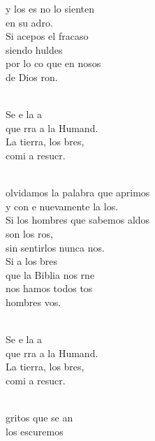 \documentclass[12pt]{article}
\begin{document}
\begin{multicols*}{2}
\begin{cancion}
	y los es no lo sienten \\
	en su adro.\\
	Si acepos el fracaso \\
	siendo huldes\\
	por lo co que en nosos \\
	de Dios ron.\\\jump\\
	\begin{chorus}%
	Se e la a\\
	que rra a la Humand.\\
	La tierra, los bres,\\
	comi a resucr.\\
	\end{chorus}%
	\jump\\
	olvidamos la palabra que aprimos\\
	y con e nuevamente la los.\\
	Si los hombres que sabemos aldos\\
	son los ros, \\
	sin sentirlos nunca nos.\\
	Si a los bres \\
	que la Biblia nos rne \\
	nos hamos todos tos \\
	hombres vos.\\\jump\\
	\begin{chorus}%
	Se e la a\\
	que rra a la Humand.\\
	La tierra, los bres,\\
	comi a resucr.\\
	\end{chorus}%
	\jump\\
	 gritos que se an \\
	los escuremos\\

\end{cancion}
\end{multicols*}
\end{document}

